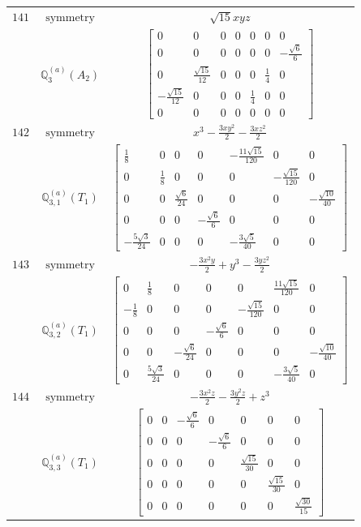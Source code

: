 \documentclass[fleqn,8pt,landscape]{jsarticle}
\begin{document}
\begin{longtable}{ccc}
$ 141 $ & $ \text{symmetry} $ & $ \sqrt{15} x y z $ \\
$  $ & $ \mathbb{Q}_{3}^{(a)}(A_{2}) $ & $ \begin{bmatrix} 0 & 0 & 0 & 0 & 0 & 0 & 0 \\ 0 & 0 & 0 & 0 & 0 & 0 & - \frac{\sqrt{6}}{6} \\ 0 & \frac{\sqrt{15}}{12} & 0 & 0 & 0 & \frac{1}{4} & 0 \\ - \frac{\sqrt{15}}{12} & 0 & 0 & 0 & \frac{1}{4} & 0 & 0 \\ 0 & 0 & 0 & 0 & 0 & 0 & 0 \end{bmatrix} $ \\ \hline
$ 142 $ & $ \text{symmetry} $ & $ x^{3} - \frac{3 x y^{2}}{2} - \frac{3 x z^{2}}{2} $ \\
$  $ & $ \mathbb{Q}_{3,1}^{(a)}(T_{1}) $ & $ \begin{bmatrix} \frac{1}{8} & 0 & 0 & 0 & - \frac{11 \sqrt{15}}{120} & 0 & 0 \\ 0 & \frac{1}{8} & 0 & 0 & 0 & - \frac{\sqrt{15}}{120} & 0 \\ 0 & 0 & \frac{\sqrt{6}}{24} & 0 & 0 & 0 & - \frac{\sqrt{10}}{40} \\ 0 & 0 & 0 & - \frac{\sqrt{6}}{6} & 0 & 0 & 0 \\ - \frac{5 \sqrt{3}}{24} & 0 & 0 & 0 & - \frac{3 \sqrt{5}}{40} & 0 & 0 \end{bmatrix} $ \\ \hline
$ 143 $ & $ \text{symmetry} $ & $ - \frac{3 x^{2} y}{2} + y^{3} - \frac{3 y z^{2}}{2} $ \\
$  $ & $ \mathbb{Q}_{3,2}^{(a)}(T_{1}) $ & $ \begin{bmatrix} 0 & \frac{1}{8} & 0 & 0 & 0 & \frac{11 \sqrt{15}}{120} & 0 \\ - \frac{1}{8} & 0 & 0 & 0 & - \frac{\sqrt{15}}{120} & 0 & 0 \\ 0 & 0 & 0 & - \frac{\sqrt{6}}{6} & 0 & 0 & 0 \\ 0 & 0 & - \frac{\sqrt{6}}{24} & 0 & 0 & 0 & - \frac{\sqrt{10}}{40} \\ 0 & \frac{5 \sqrt{3}}{24} & 0 & 0 & 0 & - \frac{3 \sqrt{5}}{40} & 0 \end{bmatrix} $ \\ \hline
$ 144 $ & $ \text{symmetry} $ & $ - \frac{3 x^{2} z}{2} - \frac{3 y^{2} z}{2} + z^{3} $ \\
$  $ & $ \mathbb{Q}_{3,3}^{(a)}(T_{1}) $ & $ \begin{bmatrix} 0 & 0 & - \frac{\sqrt{6}}{6} & 0 & 0 & 0 & 0 \\ 0 & 0 & 0 & - \frac{\sqrt{6}}{6} & 0 & 0 & 0 \\ 0 & 0 & 0 & 0 & \frac{\sqrt{15}}{30} & 0 & 0 \\ 0 & 0 & 0 & 0 & 0 & \frac{\sqrt{15}}{30} & 0 \\ 0 & 0 & 0 & 0 & 0 & 0 & \frac{\sqrt{30}}{15} \end{bmatrix} $ \\ \hline

\end{longtable}
\end{document}
